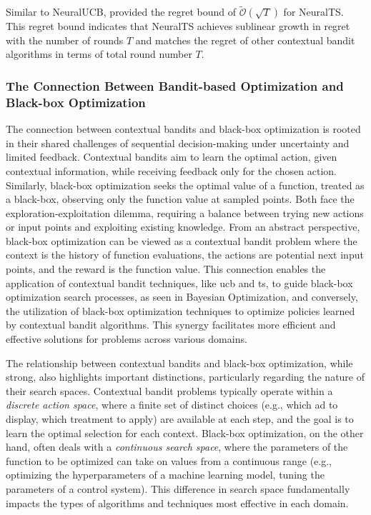 Similar to NeuralUCB, \citet{zhang2021neural} provided the regret bound of $\widetilde{\mathcal{O}}(\sqrt{T})$ for NeuralTS. This regret bound indicates that NeuralTS achieves sublinear growth in regret with the number of rounds $T$ and matches the regret of other contextual bandit algorithms in terms of total round number $T$.




\subsubsection{The Connection Between Bandit-based Optimization and Black-box Optimization}
The connection between contextual bandits and black-box optimization is rooted in their shared challenges of sequential decision-making under uncertainty and limited feedback. Contextual bandits aim to learn the optimal action, given contextual information, while receiving feedback only for the chosen action. Similarly, black-box optimization seeks the optimal value of a function, treated as a black-box, observing only the function value at sampled points. Both face the exploration-exploitation dilemma, requiring a balance between trying new actions or input points and exploiting existing knowledge. From an abstract perspective, black-box optimization can be viewed as a contextual bandit problem where the context is the history of function evaluations, the actions are potential next input points, and the reward is the function value. This connection enables the application of contextual bandit techniques, like \acl{ucb} and \acl{ts}, to guide black-box optimization search processes, as seen in Bayesian Optimization, and conversely, the utilization of black-box optimization techniques to optimize policies learned by contextual bandit algorithms. This synergy facilitates more efficient and effective solutions for problems across various domains.

The relationship between contextual bandits and black-box optimization, while strong, also highlights important distinctions, particularly regarding the nature of their search spaces. Contextual bandit problems typically operate within a \textit{discrete action space}, where a finite set of distinct choices (e.g., which ad to display, which treatment to apply) are available at each step, and the goal is to learn the optimal selection for each context. Black-box optimization, on the other hand, often deals with a \textit{continuous search space}, where the parameters of the function to be optimized can take on values from a continuous range (e.g., optimizing the hyperparameters of a machine learning model, tuning the parameters of a control system). This difference in search space fundamentally impacts the types of algorithms and techniques most effective in each domain. 

